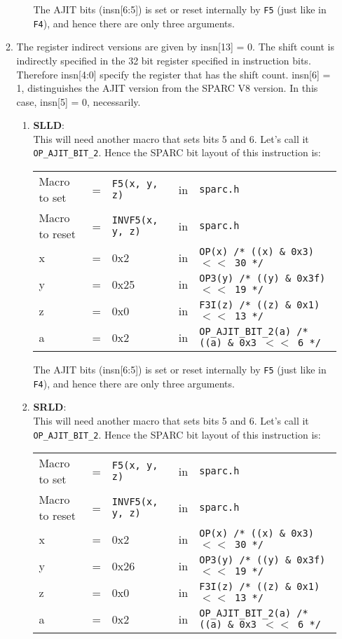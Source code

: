 \begin{itemize}
\begin{enumerate}
\begin{enumerate}
      The AJIT bits (insn[6:5]) is  set or reset internally by \texttt{F5}
      (just  like  in  \texttt{F4}),  and   hence  there  are  only  three
      arguments.

    \end{enumerate}
  \item The register  indirect versions are given by insn[13]  = 0.  The
    shift count is indirectly specified in the 32 bit register specified
    in instruction bits.  Therefore  insn[4:0] specify the register that
    has the  shift count.  insn[6]  = 1, distinguishes the  AJIT version
    from the SPARC V8 version.  In this case, insn[5] = 0, necessarily.
    \begin{enumerate}
    \item \textbf{SLLD}:\\
      This will need another macro that sets bits 5 and 6. Let's call it
      \texttt{OP\_AJIT\_BIT\_2}.   Hence the  SPARC bit  layout of  this
      instruction is:

      \begin{tabular}[h]{lclcl}
        Macro to set  &=& \texttt{F5(x, y, z)} &in& \texttt{sparc.h}     \\
        Macro to reset  &=& \texttt{INVF5(x, y, z)} &in& \texttt{sparc.h}     \\
        x &=& 0x2      &in& \texttt{OP(x)  /* ((x) \& 0x3)  $<<$ 30 */} \\
        y &=& 0x25     &in& \texttt{OP3(y) /* ((y) \& 0x3f) $<<$ 19 */} \\
        z &=& 0x0      &in& \texttt{F3I(z) /* ((z) \& 0x1)  $<<$ 13 */} \\
        a &=& 0x2      &in& \texttt{OP\_AJIT\_BIT\_2(a) /* ((a) \& 0x3  $<<$ 6 */}
      \end{tabular}

      The AJIT bits (insn[6:5]) is  set or reset internally by \texttt{F5}
      (just  like  in  \texttt{F4}),  and   hence  there  are  only  three
      arguments.

    \item \textbf{SRLD}:\\
      This will need another macro that sets bits 5 and 6. Let's call it
      \texttt{OP\_AJIT\_BIT\_2}.   Hence the  SPARC bit  layout of  this
      instruction is:

      \begin{tabular}[h]{lclcl}
        Macro to set  &=& \texttt{F5(x, y, z)} &in& \texttt{sparc.h}     \\
        Macro to reset  &=& \texttt{INVF5(x, y, z)} &in& \texttt{sparc.h}     \\
        x &=& 0x2      &in& \texttt{OP(x)  /* ((x) \& 0x3)  $<<$ 30 */} \\
        y &=& 0x26     &in& \texttt{OP3(y) /* ((y) \& 0x3f) $<<$ 19 */} \\
        z &=& 0x0      &in& \texttt{F3I(z) /* ((z) \& 0x1)  $<<$ 13 */} \\
        a &=& 0x2      &in& \texttt{OP\_AJIT\_BIT\_2(a) /* ((a) \& 0x3  $<<$ 6 */}
      \end{tabular}


\end{enumerate}
\end{enumerate}
\end{itemize}
